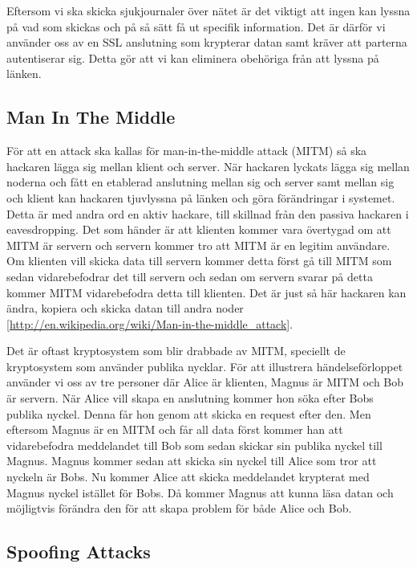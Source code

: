 Eftersom vi ska skicka sjukjournaler över nätet är det viktigt att ingen kan lyssna på vad som skickas och på så sätt få ut specifik information. Det är därför vi använder oss av en SSL anslutning som krypterar datan samt kräver att parterna autentiserar sig. Detta gör att vi kan eliminera obehöriga från att lyssna på länken. 

\subsection{Man In The Middle}

För att en attack ska kallas för man-in-the-middle attack (MITM) så ska hackaren lägga sig mellan klient och server. När hackaren lyckats lägga sig mellan noderna och fått en etablerad anslutning mellan sig och server samt mellan sig och klient kan hackaren tjuvlyssna på länken och göra förändringar i systemet. Detta är med andra ord en aktiv hackare, till skillnad från den passiva hackaren i eavesdropping. Det som händer är att klienten kommer vara övertygad om att MITM är servern och servern kommer tro att MITM är en legitim användare. Om klienten vill skicka data till servern kommer detta först gå till MITM som sedan vidarebefodrar det till servern och sedan om servern svarar på detta kommer MITM vidarebefodra detta till klienten. Det är just så här hackaren kan ändra, kopiera och skicka datan till andra noder [\url{http://en.wikipedia.org/wiki/Man-in-the-middle_attack}].

Det är oftast kryptosystem som blir drabbade av MITM, speciellt de kryptosystem som använder publika nycklar. För att illustrera händelseförloppet använder vi oss av tre personer där Alice är klienten, Magnus är MITM och Bob är servern. När Alice vill skapa en anslutning kommer hon söka efter Bobs publika nyckel. Denna får hon genom att skicka en request efter den. Men eftersom Magnus är en MITM och får all data först kommer han att vidarebefodra meddelandet till Bob som sedan skickar sin publika nyckel till Magnus. Magnus kommer sedan att skicka sin nyckel till Alice som tror att nyckeln är Bobs. Nu kommer Alice att skicka meddelandet krypterat med Magnus nyckel istället för Bobs. Då kommer Magnus att kunna läsa datan och möjligtvis förändra den för att skapa problem för både Alice och Bob. 

\subsection{Spoofing Attacks}

